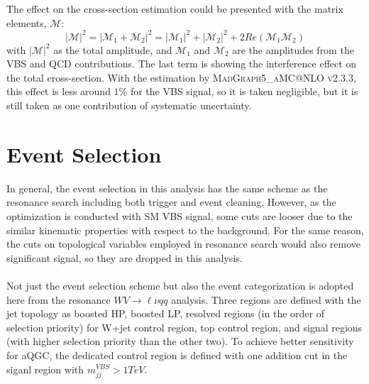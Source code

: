 The effect on the cross-section estimation could be presented with the matrix elements, $\mathcal{M}$: 
\begin{equation}
|\mathcal{M}|^2=|\mathcal{M}_1+\mathcal{M}_2|^2 = |\mathcal{M}_1|^2+|\mathcal{M}_2|^2+2Re(\mathcal{M}_1\mathcal{M}_2)
\end{equation}
with $|\mathcal{M}|^2$ as the total amplitude, and $\mathcal{M}_1$ and $\mathcal{M}_2$ are the amplitudes from the VBS and QCD contributions. The last term is showing the interference effect on the total cross-section. With the estimation by \textsc{MadGraph5\_aMC@NLO v2.3.3}\cite{Alwall:2014hca}, this effect is less around $1\%$ for the VBS signal, so it is taken negligible, but it is still taken as one contribution of systematic uncertainty.
\section{Event Selection}
In general, the event selection in this analysis has the same scheme as the resonance search including both trigger and event cleaning. However, as the optimization is conducted with SM VBS signal, some cuts are looser due to the similar kinematic properties with respect to the background. For the same reason, the cuts on topological variables employed in resonance search would also remove significant signal, so they are dropped in this analysis.
\\
\\Not just the event selection scheme but also the event categorization is adopted here from the resonance $WV\to \ell\nu qq$ analysis. Three regions are defined with the jet topology as boosted HP, boosted LP, resolved regions (in the order of selection priority) for W+jet control region, top control region, and signal regions (with higher selection priority than the other two). To achieve better sensitivity for aQGC, the dedicated control region is defined with one addition cut in the siganl region with $m^{VBS}_{jj}>1TeV$. 
